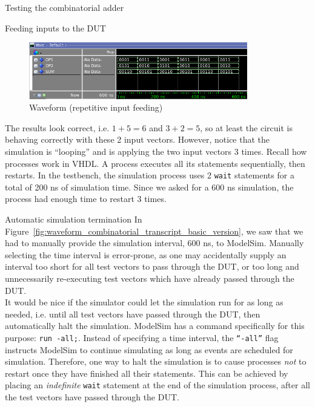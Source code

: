 \documentclass[a4paper, 12pt, onecolumn]{article}
\begin{document}
\begin{section}{Testing the combinatorial adder}
\begin{subsection}{Feeding inputs to the DUT}
\begin{enumerate}
            \begin{figure}[!h]
                \begin{centering}
                    \includegraphics[width=0.85\textwidth]{figs/waveform_combinatorial_process_reexecutes.png}
                    \caption{Waveform (repetitive input feeding)}
                    \label{fig:waveform_combinatorial_process_reexecutes}
                \end{centering}
            \end{figure}

            The results look correct, i.e. $1 + 5 = 6$ and $3 + 2 = 5$, so at least the circuit is behaving correctly with these 2 input vectors. However, notice that the simulation is ``looping'' and is applying the two input vectors 3 times. Recall how processes work in VHDL. A process executes all its statements sequentially, then restarts. In the testbench, the simulation process uses 2 \texttt{wait} statements for a total of 200 ns of simulation time. Since we asked for a 600 ns simulation, the process had enough time to restart 3 times. \\
        \end{enumerate}

        \clearpage

        \begin{subsubsection}{Automatic simulation termination}
            In Figure~\ref{fig:waveform_combinatorial_transcript_basic_version}, we saw that we had to manually provide the simulation interval, 600 ns, to ModelSim. Manually selecting the time interval is error-prone, as one may accidentally supply an interval too short for all test vectors to pass through the DUT, or too long and unnecessarily re-executing test vectors which have already passed through the DUT. \\

            It would be nice if the simulator could let the simulation run for as long as needed, i.e. until all test vectors have passed through the DUT, then automatically halt the simulation. ModelSim has a command specifically for this purpose: \texttt{run -all;}. Instead of specifying a time interval, the \texttt{``-all''} flag instructs ModelSim to continue simulating as long as events are scheduled for simulation. Therefore, one way to halt the simulation is to cause processes \emph{not} to restart once they have finished all their statements. This can be achieved by placing an \emph{indefinite} \texttt{wait} statement at the end of the simulation process, after all the test vectors have passed through the DUT.


\end{subsubsection}
\end{subsection}
\end{section}
\end{document}
